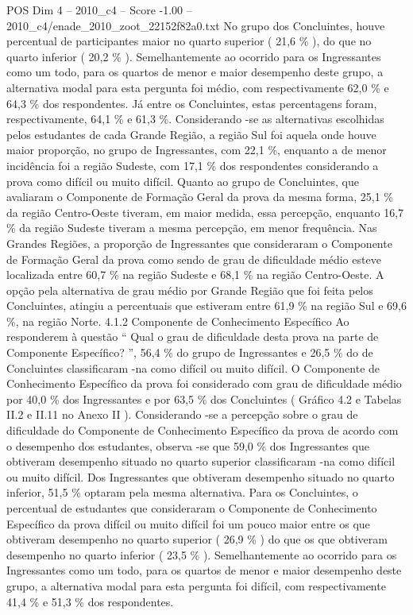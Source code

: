 \begin{textsample}{POS Dim 4 – 2010\_c4 – Score -1.00 – 2010\_c4/enade\_2010\_zoot\_22152f82a0.txt}
No grupo dos Concluintes, houve percentual de participantes maior no quarto superior ( 21,6 \% ), do que no quarto inferior ( 20,2 \% ).
Semelhantemente ao ocorrido para os Ingressantes como um todo, para os quartos de menor e maior desempenho deste grupo, a alternativa modal para esta pergunta foi médio, com respectivamente 62,0 \% e 64,3 \% dos respondentes.
Já entre os Concluintes, estas percentagens foram, respectivamente, 64,1 \% e 61,3 \%.
Considerando -se as alternativas escolhidas pelos estudantes de cada Grande Região, a região Sul foi aquela onde houve maior proporção, no grupo de Ingressantes, com 22,1 \%, enquanto a de menor incidência foi a região Sudeste, com 17,1 \% dos respondentes considerando a prova como difícil ou muito difícil.
Quanto ao grupo de Concluintes, que avaliaram o Componente de Formação Geral da prova da mesma forma, 25,1 \% da região Centro-Oeste tiveram, em maior medida, essa percepção, enquanto 16,7 \% da região Sudeste tiveram a mesma percepção, em menor frequência.
Nas Grandes Regiões, a proporção de Ingressantes que consideraram o Componente de Formação Geral da prova como sendo de grau de dificuldade médio esteve localizada entre 60,7 \% na região Sudeste e 68,1 \% na região Centro-Oeste.
A opção pela alternativa de grau médio por Grande Região que foi feita pelos Concluintes, atingiu a percentuais que estiveram entre 61,9 \% na região Sul e 69,6 \%, na região Norte. 4.1.2 Componente de Conhecimento Específico Ao responderem à questão “ Qual o grau de dificuldade desta prova na parte de Componente Específico? ”, 56,4 \% do grupo de Ingressantes e 26,5 \% do de Concluintes classificaram -na como difícil ou muito difícil.
O Componente de Conhecimento Específico da prova foi considerado com grau de dificuldade médio por 40,0 \% dos Ingressantes e por 63,5 \% dos Concluintes ( Gráfico 4.2 e Tabelas II.2 e II.11 no Anexo II ).
Considerando -se a percepção sobre o grau de dificuldade do Componente de Conhecimento Específico da prova de acordo com o desempenho dos estudantes, observa -se que 59,0 \% dos Ingressantes que obtiveram desempenho situado no quarto superior classificaram -na como difícil ou muito difícil.
Dos Ingressantes que obtiveram desempenho situado no quarto inferior, 51,5 \% optaram pela mesma alternativa.
Para os Concluintes, o percentual de estudantes que consideraram o Componente de Conhecimento Específico da prova difícil ou muito difícil foi um pouco maior entre os que obtiveram desempenho no quarto superior ( 26,9 \% ) do que os que obtiveram desempenho no quarto inferior ( 23,5 \% ).
Semelhantemente ao ocorrido para os Ingressantes como um todo, para os quartos de menor e maior desempenho deste grupo, a alternativa modal para esta pergunta foi difícil, com respectivamente 41,4 \% e 51,3 \% dos respondentes.

\end{textsample}
